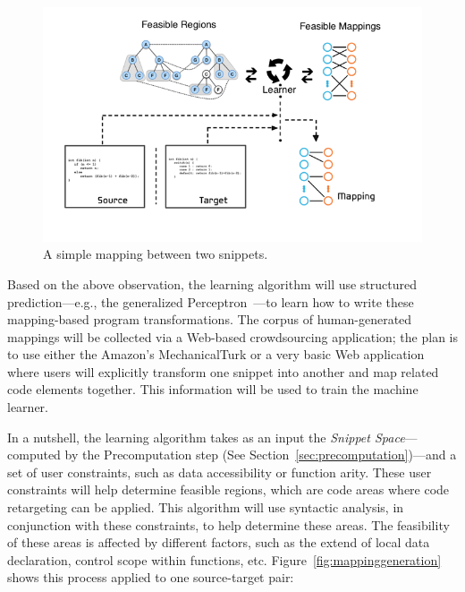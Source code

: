 \begin{figure}[!ht]
    \centering
    \includegraphics[width=\textwidth]{images/mappinggeneration}
    \caption{A simple mapping between two snippets.}
    \label{fig:mapping}
\end{figure}

Based on the above observation, the learning algorithm will use structured prediction---e.g., the generalized Perceptron~\cite{Collins:2002uo}---to learn how to write these mapping-based program transformations. The corpus of human-generated mappings will be collected via a Web-based crowdsourcing application; the plan is to use either the Amazon's MechanicalTurk or a very basic Web application where users will explicitly transform one snippet into another and map related code elements together. This information will be used to train the machine learner.

In a nutshell, the learning algorithm takes as an input the \emph{Snippet Space}---computed by the Precomputation step (See Section~\ref{sec:precomputation})---and a set of user constraints, such as data accessibility or function arity. These user constraints will help determine feasible regions, which are code areas where code retargeting can be applied. This algorithm will use syntactic analysis, in conjunction with these constraints, to help determine these areas. The feasibility of these areas is affected by different factors, such as the extend of local data declaration, control scope within functions, etc. Figure~\ref{fig:mappinggeneration} shows this process applied to one source-target pair:

